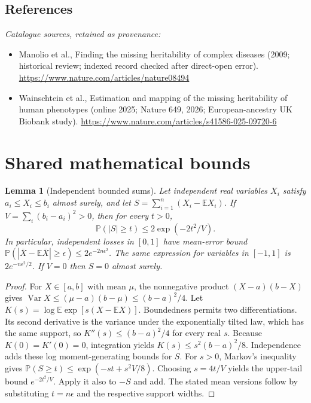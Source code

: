 \documentclass[11pt]{article}
\newcommand{\E}{\mathbb E}
\newcommand{\Prob}{\mathbb P}
\DeclareMathOperator{\Var}{Var}
\providecommand{\E}{\mathbb E}
\providecommand{\Prob}{\mathbb P}
\providecommand{\Var}{\operatorname{Var}}
\newtheorem{sharedlemma}{Lemma}[section]
\begin{document}
\subsection{References}
\noindent\emph{Catalogue sources, retained as provenance:}
\begin{itemize}
\item Manolio et al., Finding the missing heritability of complex diseases (2009; historical review; indexed record checked after direct-open error). \url{https://www.nature.com/articles/nature08494}
\item Wainschtein et al., Estimation and mapping of the missing heritability of human phenotypes (online 2025; Nature 649, 2026; European-ancestry UK Biobank study). \url{https://www.nature.com/articles/s41586-025-09720-6}
\end{itemize}
\clearpage


\appendix
\section{Shared mathematical bounds}\label{app:bounds}
\begin{sharedlemma}[Independent bounded sums]\label{lem:bounded}
Let independent real variables $X_i$ satisfy $a_i\leq X_i\leq b_i$ almost surely,
and let $S=\sum_{i=1}^n(X_i-\E X_i)$. If
$V=\sum_i(b_i-a_i)^2>0$, then for every $t>0$,
\[
 \Prob(|S|\geq t)\leq 2\exp(-2t^2/V).
\]
In particular, independent losses in $[0,1]$ have mean-error bound
$\Prob(|\overline X-\E\overline X|\geq\epsilon)
\leq2e^{-2n\epsilon^2}$. The same expression for variables in $[-1,1]$
is $2e^{-n\epsilon^2/2}$. If $V=0$ then $S=0$ almost surely.
\end{sharedlemma}
\begin{proof}
For $X\in[a,b]$ with mean $\mu$, the nonnegative product
$(X-a)(b-X)$ gives
$\Var X\leq(\mu-a)(b-\mu)\leq(b-a)^2/4$.
Let $K(s)=\log\E\exp[s(X-\E X)]$.
Boundedness permits two differentiations. Its second derivative is the variance
under the exponentially tilted law, which has the same support, so
$K''(s)\leq(b-a)^2/4$ for every real $s$.
Because $K(0)=K'(0)=0$, integration yields
$K(s)\leq s^2(b-a)^2/8$.
Independence adds these log moment-generating bounds for $S$.
For $s>0$, Markov's inequality gives
$\Prob(S\geq t)\leq\exp(-st+s^2V/8)$.
Choosing $s=4t/V$ yields the upper-tail bound $e^{-2t^2/V}$.
Apply it also to $-S$ and add. The stated mean versions follow by substituting
$t=n\epsilon$ and the respective support widths.
\end{proof}
\end{document}
